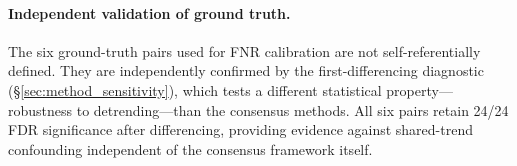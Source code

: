 \paragraph{Independent validation of ground truth.}
The six ground-truth pairs used for FNR calibration are not self-referentially defined.
They are independently confirmed by the first-differencing diagnostic (\S\ref{sec:method_sensitivity}), which tests a different statistical property---robustness to detrending---than the consensus methods.
All six pairs retain 24/24 FDR significance after differencing, providing evidence against shared-trend confounding independent of the consensus framework itself.